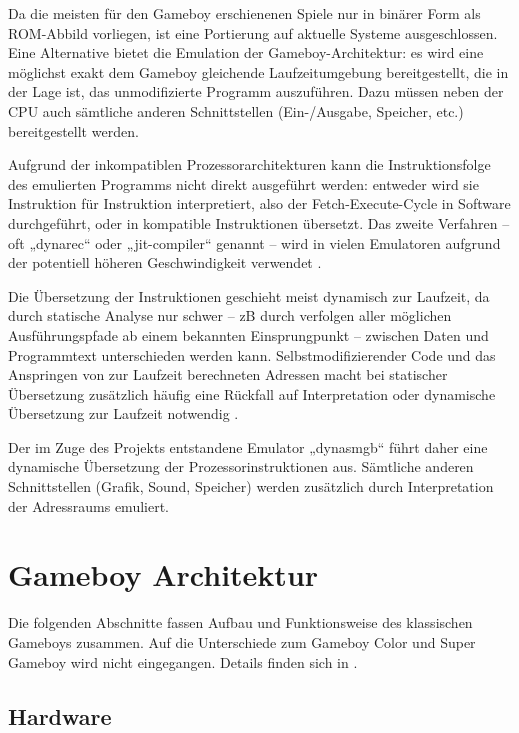 \documentclass[a4paper]{scrartcl}
\begin{document}
Da die meisten für den Gameboy erschienenen Spiele nur in binärer Form als ROM-Abbild vorliegen, ist eine Portierung auf aktuelle Systeme ausgeschlossen. Eine Alternative bietet die Emulation der Gameboy-Architektur: es wird eine möglichst exakt dem Gameboy gleichende Laufzeitumgebung bereitgestellt, die in der Lage ist, das unmodifizierte Programm auszuführen. Dazu müssen neben der CPU auch sämtliche anderen Schnittstellen (Ein-/Ausgabe, Speicher, etc.) bereitgestellt werden.

Aufgrund der inkompatiblen Prozessorarchitekturen kann die Instruktionsfolge des emulierten Programms nicht direkt ausgeführt werden: entweder wird sie Instruktion für Instruktion interpretiert, also der Fetch-Execute-Cycle in Software durchgeführt, oder in kompatible Instruktionen übersetzt. Das zweite Verfahren -- oft „dynarec“ oder „jit-compiler“ genannt -- wird in vielen Emulatoren aufgrund der potentiell höheren Geschwindigkeit verwendet \cite{pcsx2_introduction}.

Die Übersetzung der Instruktionen geschieht meist dynamisch zur Laufzeit, da durch statische Analyse nur schwer -- zB durch verfolgen aller möglichen Ausführungspfade ab einem bekannten Einsprungpunkt -- zwischen Daten und Programmtext unterschieden werden kann. Selbstmodifizierender Code und das Anspringen von zur Laufzeit berechneten Adressen macht bei statischer Übersetzung zusätzlich häufig eine Rückfall auf Interpretation oder dynamische Übersetzung zur Laufzeit notwendig \cite{nes_recompiler}.

Der im Zuge des Projekts entstandene Emulator „dynasmgb“ führt daher eine dynamische Übersetzung der Prozessorinstruktionen aus. Sämtliche anderen Schnittstellen (Grafik, Sound, Speicher) werden zusätzlich durch Interpretation der Adressraums emuliert.

\section{Gameboy Architektur}

Die folgenden Abschnitte fassen Aufbau und Funktionsweise des klassischen Gameboys zusammen. Auf die Unterschiede zum Gameboy Color und Super Gameboy wird nicht eingegangen. Details finden sich in \cite{cpu_manual}\cite{gb_programming_manual}\cite{pandocs}.

\subsection{Hardware}
\end{document}
